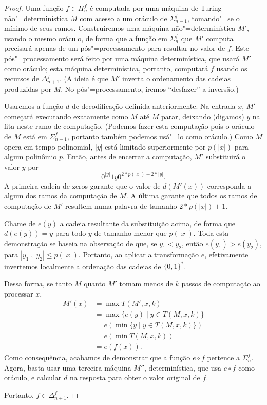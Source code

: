 \begin{proof}
    Uma função $f \in \Pi_n^f$
    é computada por uma máquina de Turing não"=determinística $M$
    com acesso a um oráculo de $\Sigma_{n-1}^f$,
    tomando"=se o mínimo de seus ramos.
    Construiremos uma máquina não"=determinística $M'$,
    usando o mesmo oráculo,
    de forma que a função em $\Sigma_n^f$ que $M'$ computa
    precisará apenas de um pós"=processamento
    para resultar no valor de $f$.
    Este pós"=processamento será feito por uma máquina determinística,
    que usará $M'$ como oráculo;
    esta máquina determinística,
    portanto, computará $f$ usando os recursos de $\Delta_{n+1}^f$.
    (A ideia é que $M'$ inverta o ordenamento das cadeias
    produzidas por $M$.
    No pós"=processamento, iremos ``desfazer'' a inversão.)

    Usaremos a função $d$ de decodificação definida anteriormente.
    Na entrada $x$, $M'$ começará executando exatamente como $M$
    até $M$ parar, deixando (digamos) $y$ na fita neste ramo de computação.
    (Podemos fazer esta computação pois o oráculo de $M$
    está em $\Sigma_{n-1}^f$,
    portanto também podemos usá"=lo como oráculo.)
    Como $M$ opera em tempo polinomial,
    $|y|$ está limitado superiormente por $p(|x|)$ para algum polinômio $p$.
    Então,
    antes de encerrar a computação,
    $M'$ substituirá o valor $y$ por
    \begin{equation*}
        0^{|y|}1 y 0^{2*p(|x|) - 2*|y|}.
    \end{equation*}
    A primeira cadeia de zeros garante que o valor de $d(M'(x))$
    corresponda a algum dos ramos da computação de $M$.
    A última garante que todos os ramos de computação de $M'$
    resultem numa palavra de tamanho $2*p(|x|)+1$.

    Chame de $e(y)$ a cadeia resultante da substituição acima,
    de forma que $d(e(y)) = y$
    para todo $y$ de tamanho menor que $p(|x|)$.
    Toda esta demonstração se baseia na observação de que,
    se $y_1 < y_2$, então $e(y_1) > e(y_2)$,
    para $|y_1|, |y_2| \leq p(|x|)$.
    Portanto,
    ao aplicar a transformação $e$,
    efetivamente invertemos localmente a ordenação das cadeias de $\{0, 1\}^*$.

    Dessa forma, se tanto $M$ quanto $M'$ tomam menos de $k$ passos de computação
    ao processar $x$,
    \begin{align*}
        M'(x) &= \max T(M', x, k) \\
              &= \max \{e(y) \mid y \in T(M, x, k) \} \\
              &= e \left( \min \{y \mid y \in T(M, x, k) \} \right) \\
              &= e \left( \min T(M, x, k) \right) \\
              &= e( f(x) ).
    \end{align*}
    Como consequência,
    acabamos de demonstrar que a função $e \circ f$ pertence a $\Sigma_n^f$.
    Agora,
    basta usar uma terceira máquina $M''$,
    determinística,
    que usa $e \circ f$ como oráculo,
    e calcular $d$ na resposta para obter o valor original de $f$.

    Portanto, $f \in \Delta_{n+1}^f$.
\end{proof}

